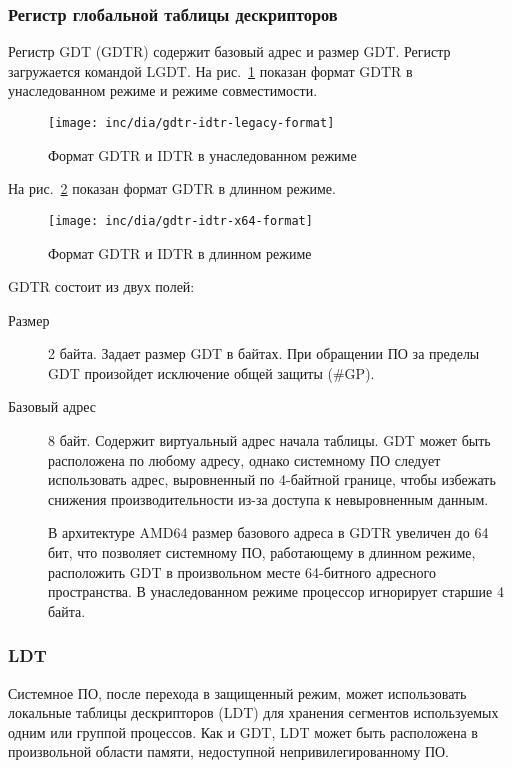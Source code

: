 \subsubsection*{Регистр глобальной таблицы дескрипторов}
Регистр GDT (GDTR) содержит базовый адрес и размер GDT. Регистр загружается командой LGDT.
На рис.~\ref{fig:gdtr-idtr-legacy-format} показан формат GDTR в унаследованном режиме и
режиме совместимости.

\begin{figure}[ht!]
  \centering
  \texttt{[image: inc/dia/gdtr-idtr-legacy-format]}
  \caption{Формат GDTR и IDTR в унаследованном режиме}
  \label{fig:gdtr-idtr-legacy-format}
\end{figure}

На рис.~\ref{fig:gdtr-idtr-x64-format} показан формат GDTR в длинном режиме.

\begin{figure}[ht!]
  \centering
  \texttt{[image: inc/dia/gdtr-idtr-x64-format]}
  \caption{Формат GDTR и IDTR в длинном режиме}
  \label{fig:gdtr-idtr-x64-format}
\end{figure}

GDTR состоит из двух полей:
\begin{description}
\item[Размер] 2 байта. Задает размер GDT в байтах. При обращении ПО за пределы GDT произойдет
	исключение общей защиты (\#GP).
\item[Базовый адрес] 8 байт. Содержит виртуальный адрес начала таблицы. GDT может быть расположена
	по любому адресу, однако системному ПО следует использовать адрес, выровненный по 4-байтной границе,
	чтобы избежать снижения производительности из-за доступа к невыровненным данным.

	В архитектуре AMD64 размер базового адреса в GDTR увеличен до 64 бит, что позволяет системному ПО,
	работающему в длинном режиме, расположить GDT в произвольном месте 64-битного адресного пространства.
	В унаследованном режиме процессор игнорирует старшие 4 байта.
\end{description}

\subsubsection*{LDT}
Системное ПО, после перехода в защищенный режим, может использовать локальные таблицы дескрипторов (LDT)
для хранения сегментов используемых одним или группой процессов. Как и GDT, LDT может быть расположена
в произвольной области памяти, недоступной непривилегированному ПО.

